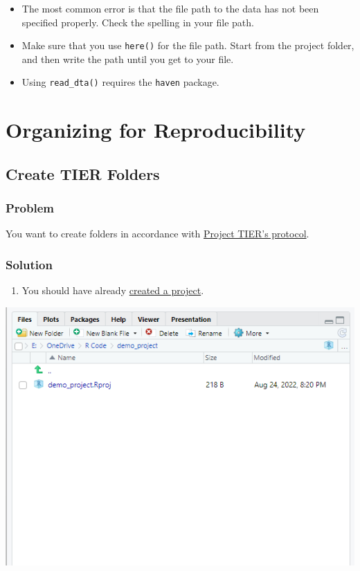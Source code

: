 \documentclass[
]{book}
\providecommand{\tightlist}{%
  \setlength{\itemsep}{0pt}\setlength{\parskip}{0pt}}
\begin{document}
\begin{itemize}
\tightlist
\item
  The most common error is that the file path to the data has not been specified properly. Check the spelling in your file path.
\item
  Make sure that you use \texttt{here()} for the file path. Start from the project folder, and then write the path until you get to your file.
\item
  Using \texttt{read\_dta()} requires the \texttt{haven} package.
\end{itemize}

\hypertarget{organizing-for-reproducibility}{%
\chapter{Organizing for Reproducibility}\label{organizing-for-reproducibility}}

\hypertarget{tiercreate}{%
\section{Create TIER Folders}\label{tiercreate}}

\hypertarget{problem-11}{%
\subsection{Problem}\label{problem-11}}

You want to create folders in accordance with \href{https://www.projecttier.org/tier-protocol/protocol-4-0/}{Project TIER's protocol}.

\hypertarget{solution-11}{%
\subsection{Solution}\label{solution-11}}

\begin{enumerate}
\def\labelenumi{\arabic{enumi}.}
\tightlist
\item
  You should have already \protect\hyperlink{project}{created a project}.
\end{enumerate}

\includegraphics[width=7.99in]{images/projdirectory2}
\end{document}
